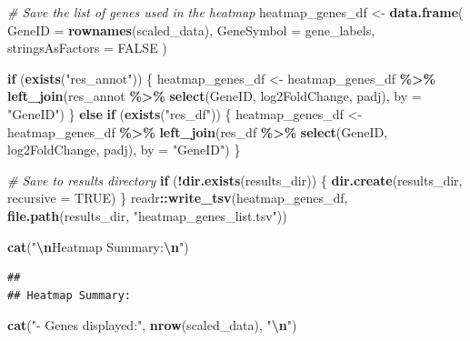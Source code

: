 \documentclass[
]{article}
\newenvironment{Shaded}{\begin{snugshade}}{\end{snugshade}}
\newcommand{\AttributeTok}[1]{\textcolor[rgb]{0.13,0.29,0.53}{#1}}
\newcommand{\CommentTok}[1]{\textcolor[rgb]{0.56,0.35,0.01}{\textit{#1}}}
\newcommand{\ConstantTok}[1]{\textcolor[rgb]{0.56,0.35,0.01}{#1}}
\newcommand{\ControlFlowTok}[1]{\textcolor[rgb]{0.13,0.29,0.53}{\textbf{#1}}}
\newcommand{\FunctionTok}[1]{\textcolor[rgb]{0.13,0.29,0.53}{\textbf{#1}}}
\newcommand{\NormalTok}[1]{#1}
\newcommand{\OtherTok}[1]{\textcolor[rgb]{0.56,0.35,0.01}{#1}}
\newcommand{\SpecialCharTok}[1]{\textcolor[rgb]{0.81,0.36,0.00}{\textbf{#1}}}
\newcommand{\StringTok}[1]{\textcolor[rgb]{0.31,0.60,0.02}{#1}}
\begin{document}
\begin{Shaded}
\begin{Highlighting}[]
\CommentTok{\# Save the list of genes used in the heatmap}
\NormalTok{heatmap\_genes\_df }\OtherTok{\textless{}{-}} \FunctionTok{data.frame}\NormalTok{(}
  \AttributeTok{GeneID =} \FunctionTok{rownames}\NormalTok{(scaled\_data),}
  \AttributeTok{GeneSymbol =}\NormalTok{ gene\_labels,}
  \AttributeTok{stringsAsFactors =} \ConstantTok{FALSE}
\NormalTok{)}

\ControlFlowTok{if}\NormalTok{ (}\FunctionTok{exists}\NormalTok{(}\StringTok{"res\_annot"}\NormalTok{)) \{}
\NormalTok{  heatmap\_genes\_df }\OtherTok{\textless{}{-}}\NormalTok{ heatmap\_genes\_df }\SpecialCharTok{\%\textgreater{}\%}
    \FunctionTok{left\_join}\NormalTok{(res\_annot }\SpecialCharTok{\%\textgreater{}\%} \FunctionTok{select}\NormalTok{(GeneID, log2FoldChange, padj), }\AttributeTok{by =} \StringTok{"GeneID"}\NormalTok{)}
\NormalTok{\} }\ControlFlowTok{else} \ControlFlowTok{if}\NormalTok{ (}\FunctionTok{exists}\NormalTok{(}\StringTok{"res\_df"}\NormalTok{)) \{}
\NormalTok{  heatmap\_genes\_df }\OtherTok{\textless{}{-}}\NormalTok{ heatmap\_genes\_df }\SpecialCharTok{\%\textgreater{}\%}
    \FunctionTok{left\_join}\NormalTok{(res\_df }\SpecialCharTok{\%\textgreater{}\%} \FunctionTok{select}\NormalTok{(GeneID, log2FoldChange, padj), }\AttributeTok{by =} \StringTok{"GeneID"}\NormalTok{)}
\NormalTok{\}}

\CommentTok{\# Save to results directory}
\ControlFlowTok{if}\NormalTok{ (}\SpecialCharTok{!}\FunctionTok{dir.exists}\NormalTok{(results\_dir)) \{}
  \FunctionTok{dir.create}\NormalTok{(results\_dir, }\AttributeTok{recursive =} \ConstantTok{TRUE}\NormalTok{)}
\NormalTok{\}}
\NormalTok{readr}\SpecialCharTok{::}\FunctionTok{write\_tsv}\NormalTok{(heatmap\_genes\_df, }\FunctionTok{file.path}\NormalTok{(results\_dir, }\StringTok{"heatmap\_genes\_list.tsv"}\NormalTok{))}

\FunctionTok{cat}\NormalTok{(}\StringTok{"}\SpecialCharTok{\textbackslash{}n}\StringTok{Heatmap Summary:}\SpecialCharTok{\textbackslash{}n}\StringTok{"}\NormalTok{)}
\end{Highlighting}
\end{Shaded}

\begin{verbatim}
## 
## Heatmap Summary:
\end{verbatim}

\begin{Shaded}
\begin{Highlighting}[]
\FunctionTok{cat}\NormalTok{(}\StringTok{"{-} Genes displayed:"}\NormalTok{, }\FunctionTok{nrow}\NormalTok{(scaled\_data), }\StringTok{"}\SpecialCharTok{\textbackslash{}n}\StringTok{"}\NormalTok{)}
\end{Highlighting}
\end{Shaded}
\end{document}
